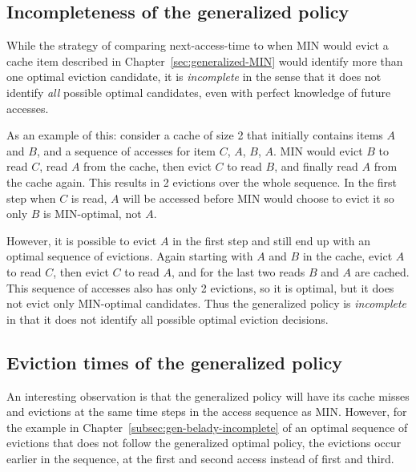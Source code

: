 \subsection{Incompleteness of the generalized policy\label{subsec:gen-belady-incomplete}}

While the strategy of comparing next-access-time to when MIN would evict a cache item described in Chapter~\ref{sec:generalized-MIN} would identify more than one optimal eviction candidate, it is \textit{incomplete} in the sense that it does not identify \textit{all} possible optimal candidates, even with perfect knowledge of future accesses.

As an example of this: consider a cache of size 2 that initially contains items $A$ and $B$, and a sequence of accesses for item $C$, $A$, $B$, $A$. MIN would evict $B$ to read $C$, read $A$ from the cache, then evict $C$ to read $B$, and finally read $A$ from the cache again. This results in 2 evictions over the whole sequence. In the first step when $C$ is read, $A$ will be accessed before MIN would choose to evict it so only $B$ is MIN-optimal, not $A$.

However, it is possible to evict $A$ in the first step and still end up with an optimal sequence of evictions. Again starting with $A$ and $B$ in the cache, evict $A$ to read $C$, then evict $C$ to read $A$, and for the last two reads $B$ and $A$ are cached. This sequence of accesses also has only 2 evictions, so it is optimal, but it does not evict only MIN-optimal candidates. Thus the generalized policy is \textit{incomplete} in that it does not identify all possible optimal eviction decisions.

\subsection{Eviction times of the generalized policy}
An interesting observation is that the generalized policy will have its cache misses and evictions at the same time steps in the access sequence as MIN. However, for the example in Chapter~\ref{subsec:gen-belady-incomplete} of an optimal sequence of evictions that does not follow the generalized optimal policy, the evictions occur earlier in the sequence, at the first and second access instead of first and third. 



